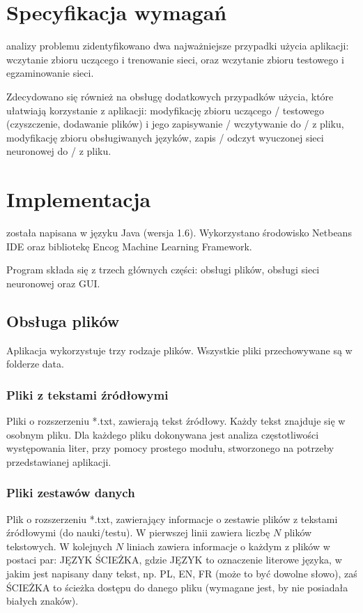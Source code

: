 \documentclass[journal]{IEEEtran}
\begin{document}

\section{Specyfikacja wymagań}
 analizy problemu zidentyfikowano dwa najważniejsze przypadki użycia aplikacji: wczytanie
zbioru uczącego i trenowanie sieci, oraz wczytanie zbioru testowego i egzaminowanie sieci.

Zdecydowano się również na obsługę dodatkowych przypadków użycia, które ułatwiają korzystanie z aplikacji:
modyfikację zbioru uczącego / testowego (czyszczenie, dodawanie plików) i jego zapisywanie / wczytywanie do / z pliku,
modyfikację zbioru obsługiwanych języków, zapis / odczyt wyuczonej sieci neuronowej do / z pliku.


\section{Implementacja}
 została napisana w języku Java (wersja 1.6). Wykorzystano środowisko Netbeans IDE
oraz bibliotekę Encog Machine Learning Framework.

Program składa się z trzech głównych części: obsługi plików, obsługi sieci neuronowej oraz GUI.

\subsection{Obsługa plików}
Aplikacja wykorzystuje trzy rodzaje plików. Wszystkie pliki przechowywane są w folderze data.

\subsubsection{Pliki z tekstami źródłowymi}
Pliki o rozszerzeniu *.txt, zawierają tekst źródłowy. Każdy tekst znajduje się w osobnym pliku. Dla każdego pliku
dokonywana jest analiza częstotliwości występowania liter, przy pomocy prostego modułu, stworzonego na potrzeby przedstawianej
aplikacji.

\subsubsection{Pliki zestawów danych}
Plik o rozszerzeniu *.txt, zawierający informacje o zestawie plików z tekstami źródłowymi (do nauki/testu).
W pierwszej linii zawiera liczbę $N$ plików tekstowych. W kolejnych $N$ liniach zawiera informacje o każdym z plików
w postaci par: JĘZYK ŚCIEŻKA, gdzie JĘZYK to oznaczenie literowe języka, w jakim jest napisany dany tekst, np. PL, EN, FR
(może to być dowolne słowo), zaś ŚCIEŻKA to ścieżka dostępu do danego pliku (wymagane jest, by nie posiadała białych znaków).
\end{document}
